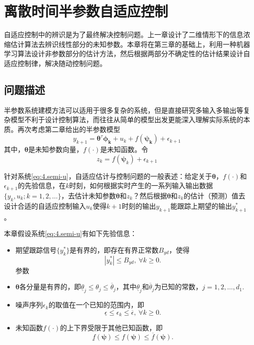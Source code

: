 \chapter{离散时间半参数自适应控制}\label{chap:4}
自适应控制中的辨识是为了最终解决控制问题。上一章设计了二维情形下的信息浓缩估计算法去辨识线性部分的未知参数。本章将在第三章的基础上，利用一种机器学习算法设计非参数部分的估计方法，然后根据两部分不确定性的估计结果设计自适应控制律，解决随动控制问题。

\section{问题描述}\label{sect:4.1}
半参数系统建模方法可以适用于很多复杂的系统，但是直接研究多输入多输出等复杂模型不利于设计控制算法，而往往从简单的模型出发更能深入理解实际系统的本质。再次考虑第二章给出的半参数模型
\begin{equation}%
\label{eq:4.semi-u}
y_{k+1} = \bm{\theta}^{\tau}\bm{\phi_{k}}+u_{k}+f(\bm{\bm{\psi}_{k}})+\epsilon_{k+1}
\end{equation}
其中，$\bm{\theta}$是未知参数向量，$f(\cdot)$是未知函数。令
\begin{equation}
z_{k} = f(\bm{\psi}_{k}) + \epsilon_{k+1}
\end{equation}

针对系统\eqref{eq:4.semi-u}，自适应估计与控制问题的一般表述：给定关于$\bm{\theta}$，$f(\cdot)$和$\epsilon_{k+1}$的先验信息，在$k$时刻，如何根据实时产生的一系列输入输出数据$\{y_{k},u_{k};k=1,2,\ldots\}$，去估计未知参数$\bm{\theta}$和$z_{k}$？然后根据$\bm{\theta}$和$z_{k}$的估计（预测）值去设计合适的自适应控制输入$u_{k}$使得$k+1$时刻的输出$y_{k+1}$能跟踪上期望的输出$y_{k+1}^{*}$。

本章假设系统\eqref{eq:4.semi-u}有如下先验信息：
\begin{itemize}
\item 期望跟踪信号$\{y_{k}^{*}\}$是有界的，即存在有界正常数$B_{yd}$，使得
\begin{equation}\label{eq:4.ydB}
|y_{k}^{*}|\leq B_{yd},\ \forall k\geq0.
\end{equation}
参数\item $\bm{\theta}$各分量是有界的，即$\underline{\theta}_{j}\leq\theta_{j}\leq\overline{\theta}_{j}$，其中$\underline{\theta}_{j}$和$\overline{\theta}_{j}$为已知的常数，$j=1,2,\ldots,d_{1}$.
\item 噪声序列$\epsilon_{k}$的取值在一个已知的范围内，即
\begin{equation}\label{eq:4.wB}
\underline{\epsilon}\leq\epsilon_{k}\leq\overline{\epsilon},\ \forall k\geq0.
\end{equation}
\item 未知函数$f(\cdot)$的上下界受限于其他已知函数，即
\begin{equation}\label{eq:4.fB}
\underline{f}(\bm{\psi})\leq f(\bm{\psi})\leq \overline{f}(\bm{\psi}).
\end{equation}
\end{itemize}


